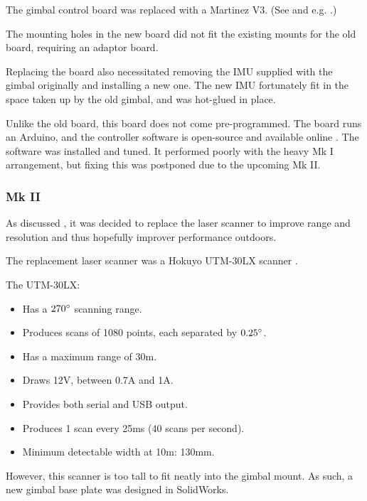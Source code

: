 \documentclass[12pt,oneside,a4paper]{book}
\begin{document}
The gimbal control board was replaced with a Martinez V3. (See  and e.g. \cite{martinez}.)

The mounting holes in the new board did not fit the existing
mounts for the old board, requiring an adaptor board. 

Replacing the board also necessitated removing the IMU supplied with
the gimbal originally and installing a new one. The new IMU
fortunately fit in the space taken up by the old gimbal, and was
hot-glued in place.

Unlike the old board, this board does not come pre-programmed. The
board runs an Arduino, and the controller software is open-source and
available online \cite{gimbalsoftware}. The software was installed and
tuned. It performed poorly with the heavy Mk I arrangement, but fixing
this was postponed due to the upcoming Mk II.

\subsubsection{Mk II}
\label{sec:mk-ii}

As discussed , it was decided to replace the laser
scanner to improve range and resolution and thus hopefully improver performance outdoors.

The replacement laser scanner was a Hokuyo UTM-30LX scanner
\cite{scanner2}. 

The UTM-30LX:
\begin{itemize}
\item Has a $270\degree$ scanning range.
\item Produces scans of 1080 points, each separated by $0.25\degree$.
\item Has a maximum range of 30m.
\item Draws 12V, between 0.7A and 1A.
\item Provides both serial and USB output.
\item Produces 1 scan every 25ms (40 scans per second).
\item {} Minimum detectable width at 10m: 130mm.
\end{itemize}

However, this scanner is too tall to fit neatly into the gimbal
mount. As such, a new gimbal base plate was designed in SolidWorks.

\end{document}
